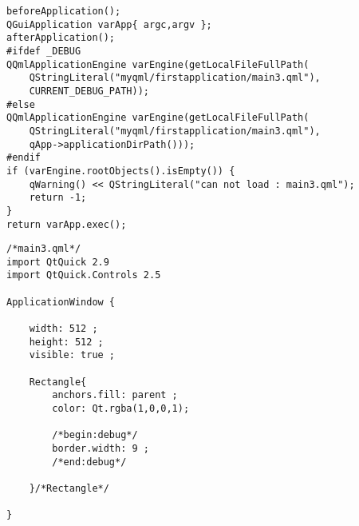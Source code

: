 \FloatBarrier
\begin{lstlisting}[label=f000022,
caption=GoodLuck,
title=\lstlistingname\ \thelstlisting\marginnote{\fbox{\footnotesize{\lstlistingname\ \thelstlisting}}}
,firstnumber=111]
beforeApplication();
QGuiApplication varApp{ argc,argv };
afterApplication();
#ifdef _DEBUG
QQmlApplicationEngine varEngine(getLocalFileFullPath(
    QStringLiteral("myqml/firstapplication/main3.qml"),
    CURRENT_DEBUG_PATH));
#else
QQmlApplicationEngine varEngine(getLocalFileFullPath(
    QStringLiteral("myqml/firstapplication/main3.qml"),
    qApp->applicationDirPath()));
#endif
if (varEngine.rootObjects().isEmpty()) {
    qWarning() << QStringLiteral("can not load : main3.qml");
    return -1;
}
return varApp.exec();
\end{lstlisting}          %
\FloatBarrier
\begin{lstlisting}[label=f000025,
caption=GoodLuck,
title=\lstlistingname\ \thelstlisting\marginnote{\fbox{\footnotesize{\lstlistingname\ \thelstlisting}}}
]
/*main3.qml*/
import QtQuick 2.9
import QtQuick.Controls 2.5

ApplicationWindow {

    width: 512 ;
    height: 512 ;
    visible: true ;

    Rectangle{
        anchors.fill: parent ;
        color: Qt.rgba(1,0,0,1);

        /*begin:debug*/
        border.width: 9 ;
        /*end:debug*/

    }/*Rectangle*/

}
\end{lstlisting}          %



































